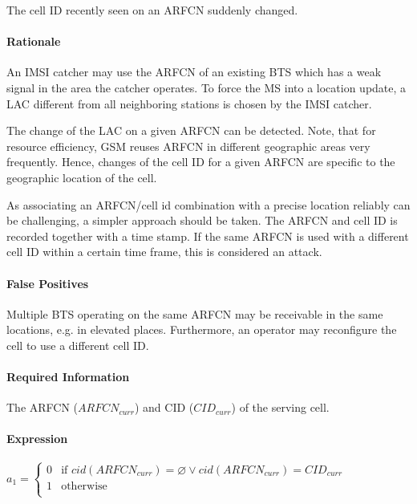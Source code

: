 \documentclass[a4paper,11pt,notitlepage,bigheadings,oneside]{scrartcl}
\begin{document}
The cell ID recently seen on an ARFCN suddenly changed.

\paragraph{Rationale}

An IMSI catcher may use the ARFCN of an existing BTS which has a weak signal in
the area the catcher operates. To force the MS into a location update, a LAC
different from all neighboring stations is chosen by the IMSI catcher.

The change of the LAC on a given ARFCN can be detected. Note, that for resource
efficiency, GSM reuses ARFCN in different geographic areas very frequently.
Hence, changes of the cell ID for a given ARFCN are specific to the geographic
location of the cell.

As associating an ARFCN/cell id combination with a precise location reliably
can be challenging, a simpler approach should be taken. The ARFCN and cell ID
is recorded together with a time stamp. If the same ARFCN is used with a
different cell ID within a certain time frame, this is considered an attack.

\paragraph{False Positives}

Multiple BTS operating on the same ARFCN may be receivable in the same
locations, e.g. in elevated places. Furthermore, an operator may reconfigure
the cell to use a different cell ID.

\paragraph{Required Information}

The ARFCN ($ARFCN_{curr}$) and CID ($CID_{curr}$) of the serving cell.

\paragraph{Expression}

$a_1 =
\begin{cases}
	0 & \text{if } cid(ARFCN_{curr}) = \varnothing \vee cid(ARFCN_{curr}) = CID_{curr} \\
	1 & \text{otherwise} \\
\end{cases}$
\end{document}
